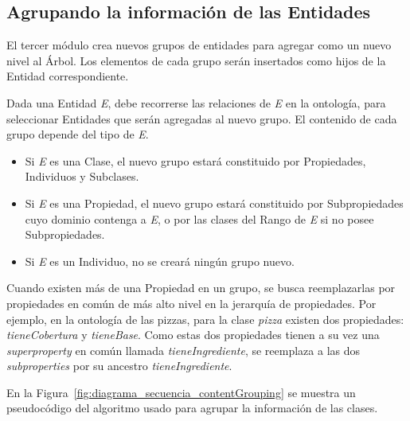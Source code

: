 \subsection{Agrupando la información de las Entidades}
\label{sec:agrupando_info}
El tercer módulo crea nuevos grupos de entidades para agregar como un nuevo nivel al Árbol. Los elementos de cada grupo serán insertados como hijos de la Entidad correspondiente.

Dada una Entidad \emph{E}, debe recorrerse las relaciones de \emph{E} en la ontología, para seleccionar Entidades que serán agregadas al nuevo grupo.
El contenido de cada grupo depende del tipo de \emph{E}.
\begin{itemize}
    \item Si \emph{E} es una Clase, el nuevo grupo estará constituido por Propiedades, Individuos y Subclases. 
    \item Si \emph{E} es una Propiedad, el nuevo grupo estará constituido por Subpropiedades cuyo dominio contenga a \emph{E}, o por las clases del Rango de \emph{E} si no posee Subpropiedades.
    \item Si \emph{E} es un Individuo, no se creará ningún grupo nuevo.
\end{itemize}

Cuando existen más de una Propiedad en un grupo, se busca reemplazarlas por propiedades en común de más alto nivel en la jerarquía de propiedades. Por ejemplo, en la ontología de las pizzas, para la clase \emph{pizza} existen dos propiedades: \emph{tieneCobertura} y \emph{tieneBase}. Como estas dos propiedades tienen a su vez una \emph{superproperty} en común llamada \emph{tieneIngrediente}, se reemplaza a las dos \emph{subproperties} por su ancestro \emph{tieneIngrediente}.

En la Figura~\ref{fig:diagrama_secuencia_contentGrouping} se muestra un pseudocódigo del algoritmo usado para agrupar la información de las clases.
 
